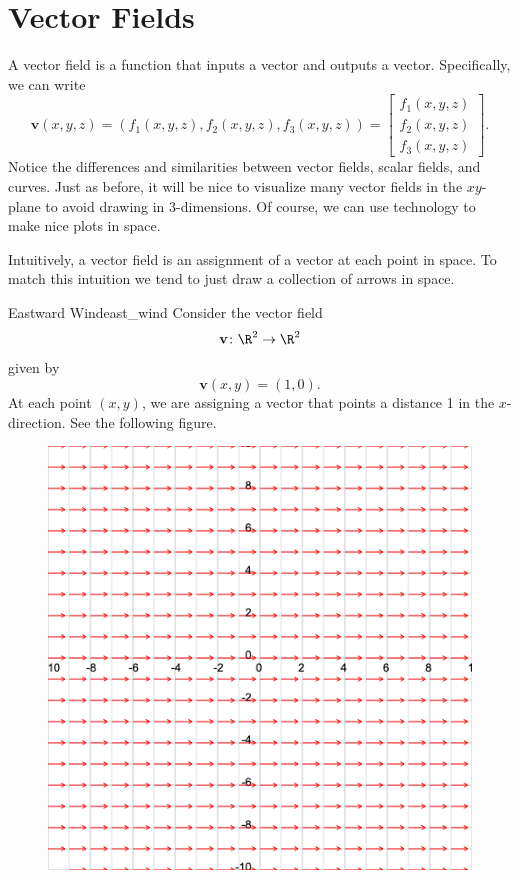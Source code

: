         \section{Vector Fields}
        
        A vector field is a function that inputs a vector and outputs a vector. Specifically, we can write
        \[
        \mathbf{v}(x,y,z)=(f_1(x,y,z),f_2(x,y,z),f_3(x,y,z))=\begin{bmatrix} f_1(x,y,z)\\ f_2(x,y,z) \\ f_3(x,y,z)\end{bmatrix}.
        \]
        Notice the differences and similarities between vector fields, scalar fields, and curves.  Just as before, it will be nice to visualize many vector fields in the $xy$-plane to avoid drawing in 3-dimensions. Of course, we can use technology to make nice plots in space.
        
        Intuitively, a vector field is an assignment of a vector at each point in space.  To match this intuition we tend to just draw a collection of arrows in space.
        
        \begin{ex}{Eastward Wind}{east_wind}
        Consider the vector field
        \[
        \mathbf{v}\colon \R^2 \to \R^2
        \]
        given by
        \[
        \mathbf{v}(x,y)=(1,0).
        \]
        At each point $(x,y)$, we are assigning a vector that points a distance 1 in the $x$-direction. See the following figure.
        \begin{figure}[H]
            \centering
            \includegraphics[width=.6\textwidth]{Figures/wind_field.png}
        \end{figure}
        \end{ex}
        
